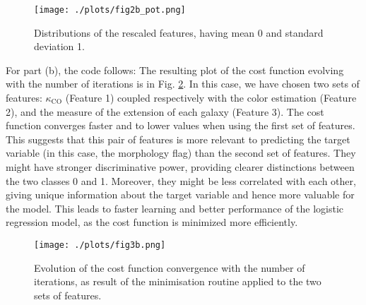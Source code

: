 \begin{figure}[h!]
  \centering
  \texttt{[image: ./plots/fig2b\_pot.png]}
  \caption{Distributions of the rescaled features, having mean 0 and standard deviation 1.} 
  \label{fig:fig3a}
\end{figure}

For part (b), the code follows: 
The resulting plot of the cost function evolving with the number of iterations is in Fig. \ref{fig:fig3b}. In this case, we have chosen two sets of features: $\kappa_\text{CO}$ (Feature 1) coupled respectively with the color estimation (Feature 2), and the measure of the extension of each galaxy (Feature 3).
The cost function converges faster and to lower values when using the first set of features. 
This suggests that this pair of features is more relevant to predicting the target variable (in this case, the morphology flag) than the second set of features. 
They might have stronger discriminative power, providing clearer distinctions between the two classes 0 and 1. 
Moreover, they might be less correlated with each other, giving unique information about the target variable and hence more valuable for the model.
This leads to faster learning and better performance of the logistic regression model, as the cost function is minimized more efficiently. 

\begin{figure}[h!]
  \centering
  \texttt{[image: ./plots/fig3b.png]}
  \caption{Evolution of the cost function convergence with the number of iterations, as result of the minimisation routine applied to the two sets of features.} 
  \label{fig:fig3b}
\end{figure}


